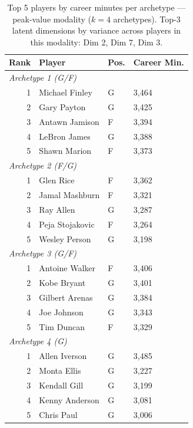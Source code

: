 \begin{table}[htbp]
  \centering\small
  \begin{tabular}{rlll}
    \toprule
    Rank & Player & Pos. & Career Min. \\
    \midrule
    \multicolumn{4}{l}{\textit{Archetype 1 (G/F)}} \\
    \midrule
    1 & Michael Finley & G & 3,464 \\
    2 & Gary Payton & G & 3,425 \\
    3 & Antawn Jamison & F & 3,394 \\
    4 & LeBron James & G & 3,388 \\
    5 & Shawn Marion & F & 3,373 \\
    \midrule[0.4pt]
    \multicolumn{4}{l}{\textit{Archetype 2 (F/G)}} \\
    \midrule
    1 & Glen Rice & F & 3,362 \\
    2 & Jamal Mashburn & F & 3,321 \\
    3 & Ray Allen & G & 3,287 \\
    4 & Peja Stojakovic & F & 3,264 \\
    5 & Wesley Person & G & 3,198 \\
    \midrule[0.4pt]
    \multicolumn{4}{l}{\textit{Archetype 3 (G/F)}} \\
    \midrule
    1 & Antoine Walker & F & 3,406 \\
    2 & Kobe Bryant & G & 3,401 \\
    3 & Gilbert Arenas & G & 3,384 \\
    4 & Joe Johnson & G & 3,343 \\
    5 & Tim Duncan & F & 3,329 \\
    \midrule[0.4pt]
    \multicolumn{4}{l}{\textit{Archetype 4 (G)}} \\
    \midrule
    1 & Allen Iverson & G & 3,485 \\
    2 & Monta Ellis & G & 3,227 \\
    3 & Kendall Gill & G & 3,199 \\
    4 & Kenny Anderson & G & 3,081 \\
    5 & Chris Paul & G & 3,006 \\
    \bottomrule
  \end{tabular}
  \caption{Top 5 players by career minutes per archetype --- peak-value modality ($k=4$ archetypes). Top-3 latent dimensions by variance across players in this modality: Dim 2, Dim 7, Dim 3.}
  \label{tab:arch_reps_peak_value}
\end{table}

